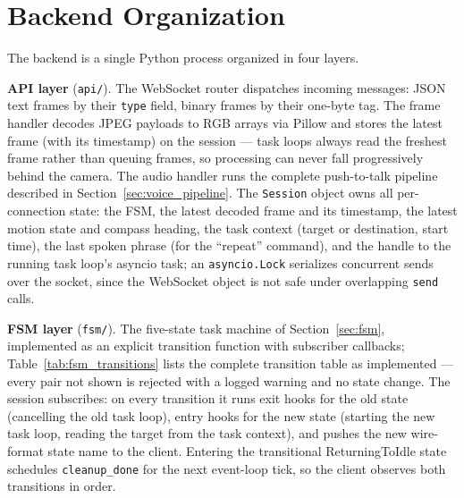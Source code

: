 \section{Backend Organization}
\label{sec:backend_org}

The backend is a single Python process organized in four layers.

\textbf{API layer} (\texttt{api/}). The WebSocket router dispatches incoming
messages: JSON text frames by their \texttt{type} field, binary frames by their
one-byte tag. The frame handler decodes JPEG payloads to RGB arrays via Pillow and
stores the latest frame (with its timestamp) on the session --- task loops always
read the freshest frame rather than queuing frames, so processing can never fall
progressively behind the camera. The audio handler runs the complete push-to-talk
pipeline described in Section~\ref{sec:voice_pipeline}. The \texttt{Session}
object owns all per-connection state: the FSM, the latest decoded frame and its
timestamp, the latest motion state and compass heading, the task context (target
or destination, start time), the last spoken phrase (for the ``repeat'' command),
and the handle to the running task loop's asyncio task; an \texttt{asyncio.Lock}
serializes concurrent sends over the socket, since the WebSocket object is not
safe under overlapping \texttt{send} calls.

\textbf{FSM layer} (\texttt{fsm/}). The five-state task machine of
Section~\ref{sec:fsm}, implemented as an explicit transition function with
subscriber callbacks; Table~\ref{tab:fsm_transitions} lists the complete
transition table as implemented --- every pair not shown is rejected with a
logged warning and no state change. The session subscribes: on every transition it
runs exit hooks for the old state (cancelling the old task loop), entry hooks for
the new state (starting the new task loop, reading the target from the task
context), and pushes the new wire-format state name to the client. Entering the
transitional ReturningToIdle state schedules \texttt{cleanup\_done} for the next
event-loop tick, so the client observes both transitions in order.

